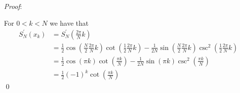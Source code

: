 \documentclass[12pt]{article}
\renewenvironment{proof}{\hspace{-4 ex} \emph{Proof}:}{\qed}
\begin{document}
\begin{proof}
	
	For $0 < k < N$ we have that
	\begin{align*}
		S_N^\prime(x_k) &= S_N^\prime\left(\frac{2\pi}{N}k \right) \\
		&= \frac{1}{2}\cos\left(\frac{N}{2}\frac{2\pi}{N}k \right)\cot \left( \frac{1}{2}\frac{2\pi}{N}k \right) - 
		\frac{1}{2N}\sin \left(\frac{N}{2}\frac{2\pi}{N}k \right)  \csc^2 \left( \frac{1}{2}\frac{2\pi}{N}k \right) \\
		&= \frac{1}{2}\cos(\pi k )\cot \left( \frac{\pi k}{N} \right) - 
		\frac{1}{2N}\sin(\pi k )  \csc^2 \left( \frac{\pi k}{N} \right) \\
		&= \frac{1}{2}(-1)^k \cot \left( \frac{\pi k}{N} \right)
	\end{align*}
\end{proof}
\end{document}
